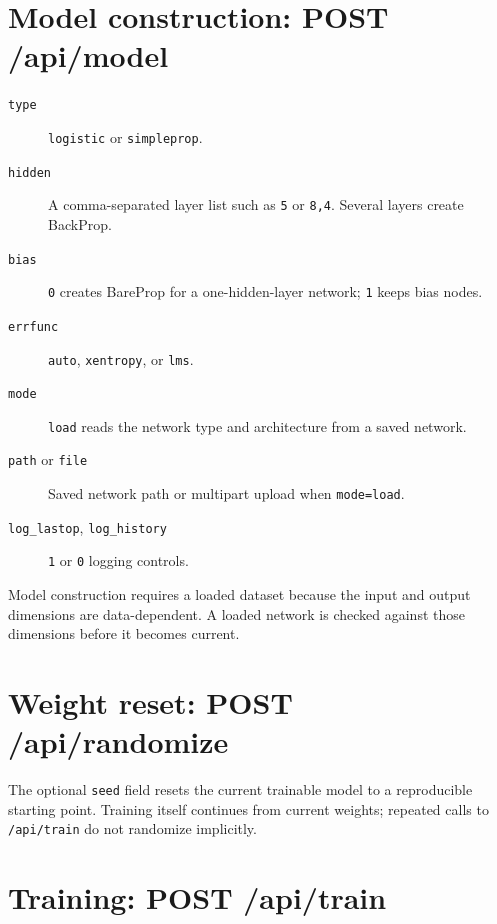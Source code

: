 \section{Model construction: POST /api/model}

\begin{description}
\item[\texttt{type}] \texttt{logistic} or \texttt{simpleprop}.
\item[\texttt{hidden}] A comma-separated layer list such as
\texttt{5} or \texttt{8,4}.  Several layers create BackProp.
\item[\texttt{bias}] \texttt{0} creates BareProp for a one-hidden-layer
network; \texttt{1} keeps bias nodes.
\item[\texttt{errfunc}] \texttt{auto}, \texttt{xentropy}, or
\texttt{lms}.
\item[\texttt{mode}] \texttt{load} reads the network type and
architecture from a saved network.
\item[\texttt{path} or \texttt{file}] Saved network path or multipart
upload when \texttt{mode=load}.
\item[\texttt{log\_lastop}, \texttt{log\_history}] \texttt{1} or
\texttt{0} logging controls.
\end{description}

Model construction requires a loaded dataset because the input and
output dimensions are data-dependent.  A loaded network is checked
against those dimensions before it becomes current.

\section{Weight reset: POST /api/randomize}

The optional \texttt{seed} field resets the current trainable model to
a reproducible starting point.  Training itself continues from current
weights; repeated calls to \texttt{/api/train} do not randomize
implicitly.

\section{Training: POST /api/train}

